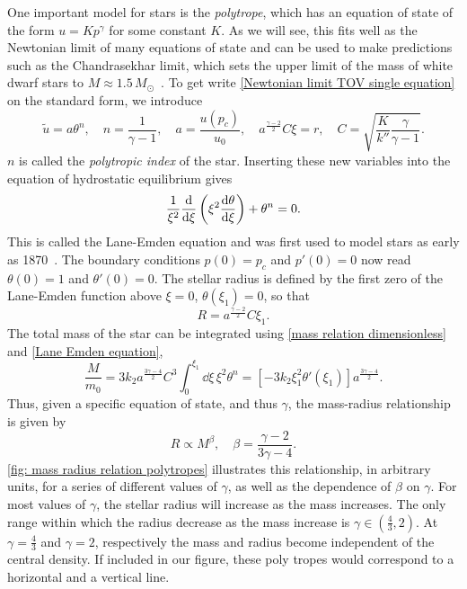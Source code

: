 One important model for stars is the \emph{polytrope}, which has an equation of state of the form $u = K p^\gamma$ for some constant $K$.
As we will see, this fits well as the Newtonian limit of many equations of state and can be used to make predictions such as the Chandrasekhar limit, which sets the upper limit of the mass of white dwarf stars to $M \approx 1.5 \, M_\odot$~\autocite{chandrasekharHighlyCollapsedConfigurations1935,glendenningCompactStarsNuclear2012}.
To get write \autoref{Newtonian limit TOV single equation} on the standard form, we introduce
%
\begin{equation}
    \tilde u = a \theta^{n}, \quad 
    n = \frac{1}{\gamma - 1}, \quad 
    a = \frac{u(p_c)}{u_0}, 
    \quad a^{\frac{\gamma - 2}{2}}C \xi = r, \quad 
    C =\sqrt{ \frac{K}{k''} \frac{\gamma}{\gamma - 1}}.
\end{equation}
%
$n$ is called the \emph{polytropic index} of the star.
Inserting these new variables into the equation of hydrostatic equilibrium gives
%
\begin{equation}
    \label{Lane Emden equation}
    \frac{1}{\xi^2} \odv{}{\xi} \left(\xi^2 \odv{\theta}{\xi} \right) + \theta^n = 0.
\end{equation}
%
This is called the Lane-Emden equation and was first used to model stars as early as 1870~\autocite{laneTheoreticalTemperatureSun1870}.
The boundary conditions $p(0) = p_c$ and $p'(0) = 0$ now read $\theta(0) = 1$ and $\theta'(0) = 0$.
The stellar radius is defined by the first zero of the Lane-Emden function above $\xi = 0$, $\theta(\xi_1) = 0$, so that
%
\begin{equation}
    R = a^{\frac{\gamma-2}{2}} C \xi_1. 
\end{equation}
%
The total mass of the star can be integrated using \autoref{mass relation dimensionless} and \autoref{Lane Emden equation},
%
\begin{equation}
    \frac{M}{m_0} = 3 k_2 a^{\frac{3\gamma-4}{2}} C^3 \int^{\xi_1}_0 \dd \xi \, \xi^2 \theta^n = [-3 k_2 \xi_1^2 \theta'(\xi_1)] a^{\frac{3\gamma-4}{2}}.
\end{equation}
%
Thus, given a specific equation of state, and thus $\gamma$, the mass-radius relationship is given by
%
\begin{equation}
    \label{Polytrope mass radius relationship}
    R \propto M^\beta, \quad \beta = {\frac{\gamma - 2}{3 \gamma - 4}}.
\end{equation}
%
\autoref{fig: mass radius relation polytropes} illustrates this relationship, in arbitrary units, for a series of different values of $\gamma$, as well as the dependence of $\beta$ on $\gamma$.
For most values of $\gamma$, the stellar radius will increase as the mass increases.
The only range within which the radius decrease as the mass increase is $\gamma \in \left(\frac{4}{3}, 2 \right)$.
At $\gamma = \frac{4}{3}$ and $\gamma = 2$, respectively the mass and radius become independent of the central density.
If included in our figure, these poly tropes would correspond to a horizontal and a vertical line.

